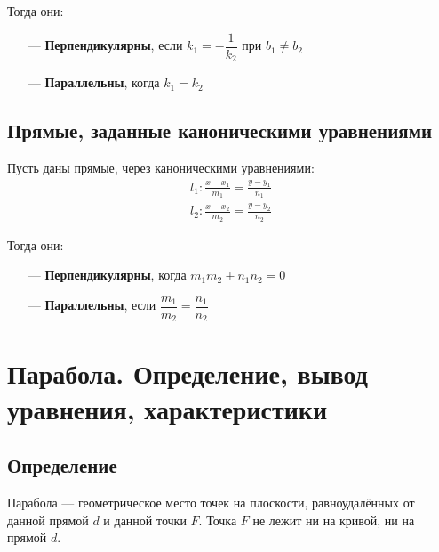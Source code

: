 \documentclass[a4paper,12pt]{extbook}
\theoremstyle{numbered}
\theoremstyle{named}
\theoremstyle{named}
\theoremstyle{named}
\begin{document}
Тогда они:
\begin{itemize}
    \item[—]{\textbf{Перпендикулярны}, если \(k_1 = -\dfrac{1}{k_2}\) при \(b_1 \neq b_2\)}
    \item[—]{\textbf{Параллельны}, когда \(k_1 = k_2\)}
\end{itemize}

\subsection*{Прямые, заданные каноническими уравнениями}
Пусть даны прямые, через каноническими уравнениями:
\begin{gather*}
    l_1: \frac{x - x_1}{m_1} = \frac{y - y_1}{n_1} \\
    l_2: \frac{x - x_2}{m_2} = \frac{y - y_2}{n_2}
\end{gather*}

Тогда они:
\begin{itemize}
    \item[—]{\textbf{Перпендикулярны}, когда \(m_1m_2 + n_1n_2 = 0\)}
    \item[—]{\textbf{Параллельны}, если \(\dfrac{m_1}{m_2} = \dfrac{n_1}{n_2}\)}
\end{itemize}




\section{Парабола. Определение, вывод уравнения, характеристики}\label{sec:parabola}

\subsection*{Определение}
Парабола — геометрическое место точек на плоскости, равноудалённых от данной прямой \(d\) и данной точки \(F\).
Точка \(F\) не лежит ни на кривой, ни на прямой \(d\).
\end{document}
